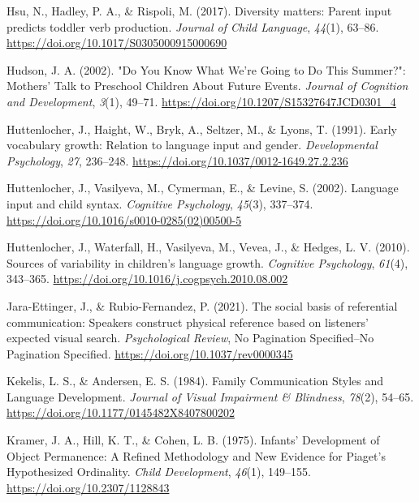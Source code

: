 \documentclass[
  man]{apa6}
\newlength{\cslhangindent}
\newlength{\cslentryspacingunit} %
\newenvironment{CSLReferences}[2] %
 {%
  \setlength{\parindent}{0pt}
  \ifodd #1
  \let\oldpar\par
  \def\par{\hangindent=\cslhangindent\oldpar}
  \fi
  \setlength{\parskip}{#2\cslentryspacingunit}
 }%
 {}
\begin{document}
\begin{CSLReferences}{1}{0}
\leavevmode{}%
Hsu, N., Hadley, P. A., \& Rispoli, M. (2017). Diversity matters: Parent input predicts toddler verb production. \emph{Journal of Child Language}, \emph{44}(1), 63--86. \url{https://doi.org/10.1017/S0305000915000690}

\leavevmode{}%
Hudson, J. A. (2002). "{Do You Know What We}'re {Going} to {Do This Summer}?": {Mothers}' {Talk} to {Preschool Children About Future Events}. \emph{Journal of Cognition and Development}, \emph{3}(1), 49--71. \url{https://doi.org/10.1207/S15327647JCD0301_4}

\leavevmode{}%
Huttenlocher, J., Haight, W., Bryk, A., Seltzer, M., \& Lyons, T. (1991). Early vocabulary growth: {Relation} to language input and gender. \emph{Developmental Psychology}, \emph{27}, 236--248. \url{https://doi.org/10.1037/0012-1649.27.2.236}

\leavevmode{}%
Huttenlocher, J., Vasilyeva, M., Cymerman, E., \& Levine, S. (2002). Language input and child syntax. \emph{Cognitive Psychology}, \emph{45}(3), 337--374. \url{https://doi.org/10.1016/s0010-0285(02)00500-5}

\leavevmode{}%
Huttenlocher, J., Waterfall, H., Vasilyeva, M., Vevea, J., \& Hedges, L. V. (2010). Sources of variability in children's language growth. \emph{Cognitive Psychology}, \emph{61}(4), 343--365. \url{https://doi.org/10.1016/j.cogpsych.2010.08.002}

\leavevmode{}%
Jara-Ettinger, J., \& Rubio-Fernandez, P. (2021). The social basis of referential communication: {Speakers} construct physical reference based on listeners' expected visual search. \emph{Psychological Review}, No Pagination Specified--No Pagination Specified. \url{https://doi.org/10.1037/rev0000345}

\leavevmode{}%
Kekelis, L. S., \& Andersen, E. S. (1984). Family {Communication Styles} and {Language Development}. \emph{Journal of Visual Impairment \& Blindness}, \emph{78}(2), 54--65. \url{https://doi.org/10.1177/0145482X8407800202}

\leavevmode{}%
Kramer, J. A., Hill, K. T., \& Cohen, L. B. (1975). Infants' {Development} of {Object Permanence}: {A Refined Methodology} and {New Evidence} for {Piaget}'s {Hypothesized Ordinality}. \emph{Child Development}, \emph{46}(1), 149--155. \url{https://doi.org/10.2307/1128843}


\end{CSLReferences}
\end{document}

